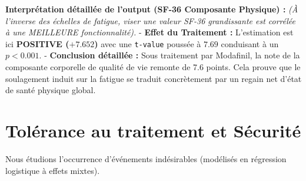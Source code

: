 \documentclass[
  letterpaper,
  DIV=11,
  numbers=noendperiod]{scrartcl}
\newenvironment{Shaded}{\begin{snugshade}}{\end{snugshade}}
\newcommand{\AttributeTok}[1]{\textcolor[rgb]{0.40,0.45,0.13}{#1}}
\newcommand{\DecValTok}[1]{\textcolor[rgb]{0.68,0.00,0.00}{#1}}
\newcommand{\FunctionTok}[1]{\textcolor[rgb]{0.28,0.35,0.67}{#1}}
\newcommand{\NormalTok}[1]{\textcolor[rgb]{0.00,0.23,0.31}{#1}}
\newcommand{\OtherTok}[1]{\textcolor[rgb]{0.00,0.23,0.31}{#1}}
\newcommand{\SpecialCharTok}[1]{\textcolor[rgb]{0.37,0.37,0.37}{#1}}
\newcommand{\StringTok}[1]{\textcolor[rgb]{0.13,0.47,0.30}{#1}}
\begin{document}
\textbf{Interprétation détaillée de l'output (SF-36 Composante Physique)
:} \emph{(À l'inverse des échelles de fatigue, viser une valeur SF-36
grandissante est corrélée à une MEILLEURE fonctionnalité).} -
\textbf{Effet du Traitement :} L'estimation est ici \textbf{POSITIVE
(\(+7.652\))} avec une \texttt{t-value} poussée à \(7.69\) conduisant à
un \(p < 0.001\). - \textbf{Conclusion détaillée :} Sous traitement par
Modafinil, la note de la composante corporelle de qualité de vie remonte
de 7.6 points. Cela prouve que le soulagement induit sur la fatigue se
traduit concrètement par un regain net d'état de santé physique global.

\section{Tolérance au traitement et
Sécurité}\label{toluxe9rance-au-traitement-et-suxe9curituxe9}

Nous étudions l'occurrence d'événements indésirables (modélisés en
régression logistique à effets mixtes).

\begin{Shaded}
\end{Shaded}
\end{document}
